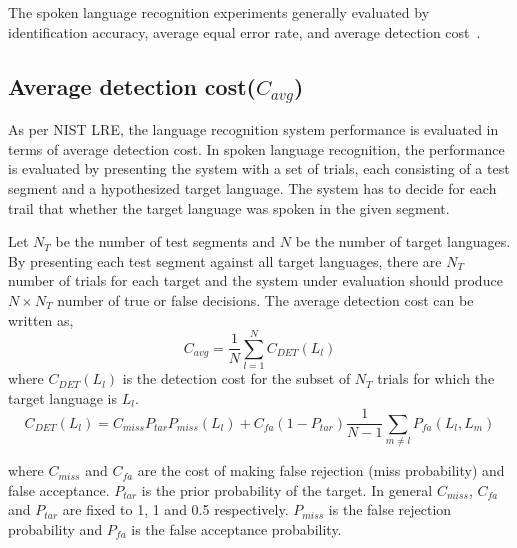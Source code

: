 \begin{spacing}{1.5}
The spoken language recognition experiments generally evaluated by identification accuracy, average equal error rate, and average detection cost~\cite{li2013spoken}.

\subsection{Average detection cost($C_{avg}$)}
As per NIST LRE, the language recognition system performance is evaluated in terms of average detection cost. In spoken language recognition, the
performance is evaluated by presenting the system with a set of trials, each consisting of a test segment and a hypothesized target language. The system has to decide for each trail that whether the target language was spoken in the given segment.

Let $N_{T}$ be the number of test segments and $N$ be the number of target languages. By presenting each test segment against all target languages, there are $N_{T}$ number of trials for each target and the system under evaluation should produce $N \times N_{T}$ number of true or false
decisions. The average detection cost can be written as,
$$C_{avg}=\frac{1}{N}\sum_{l=1}^{N}C_{DET}(L_{l})$$
where $C_{DET}(L_{l})$ is the detection cost for the subset of $N_{T}$ trials for which the target language is $L_{l}$.
$$C_{DET}(L_{l})=C_{miss}P_{tar}P_{miss}(L_{l})+C_{fa}(1-P_{tar})\frac{1}{N-1}\sum_{m \neq l}P_{fa}(L_{l},L_{m})$$

where $C_{miss}$ and $C_{fa}$ are the cost of making false rejection (miss probability) and false acceptance. $P_{tar}$ is the prior probability of the target. In general $C_{miss}$, $C_{fa}$ and $P_{tar}$ are fixed to 1, 1 and 0.5 respectively. $P_{miss}$ is the false rejection probability and  $P_{fa}$ is the false acceptance probability. 






\end{spacing}
